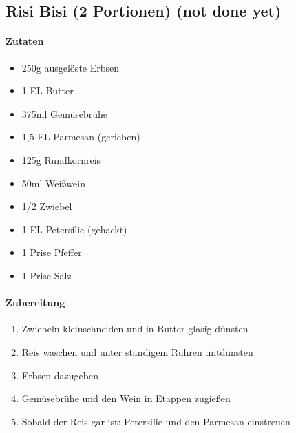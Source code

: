 \newpage
\subsection{Risi Bisi (2 Portionen) (not done yet)}
\paragraph{Zutaten}
\begin{itemize}[noitemsep]
	\item 250g ausgelöste Erbsen
	\item 1 EL Butter
	\item 375ml Gemüsebrühe
	\item 1,5 EL Parmesan (gerieben)
	\item 125g Rundkornreis
	\item 50ml Weißwein
	\item 1/2 Zwiebel
	\item 1 EL Petersilie (gehackt)
	\item 1 Prise Pfeffer
	\item 1 Prise Salz
\end{itemize}
\paragraph{Zubereitung}
\begin{enumerate}[noitemsep]
	\item Zwiebeln kleinschneiden und in Butter glasig dünsten
	\item Reis waschen und unter ständigem Rühren mitdünsten
	\item Erbsen dazugeben
	\item Gemüsebrühe und den Wein in Etappen zugießen
	\item Sobald der Reis gar ist: Petersilie und den Parmesan einstreuen
\end{enumerate}